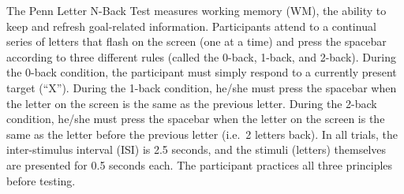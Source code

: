 \documentclass[%
numbers=noendperiod,
parskip=half,
bibliography=totoc,
,
]{scrartcl}
\begin{document}
The Penn Letter N-Back Test measures working memory (WM), the ability to keep
and refresh goal-related information. Participants attend to a continual series
of letters that flash on the screen (one at a time) and press the spacebar
according to three different rules (called the 0-back, 1-back, and 2-back).
During the 0-back condition, the participant must simply respond to a currently
present target (``X''). During the 1-back condition, he/she must press the
spacebar when the letter on the screen is the same as the previous letter.
During the 2-back condition, he/she must press the spacebar when the letter on
the screen is the same as the letter before the previous letter (i.e.~2 letters
back). In all trials, the inter-stimulus interval (ISI) is 2.5 seconds, and the
stimuli (letters) themselves are presented for 0.5 seconds each. The participant
practices all three principles before testing.
\end{document}
